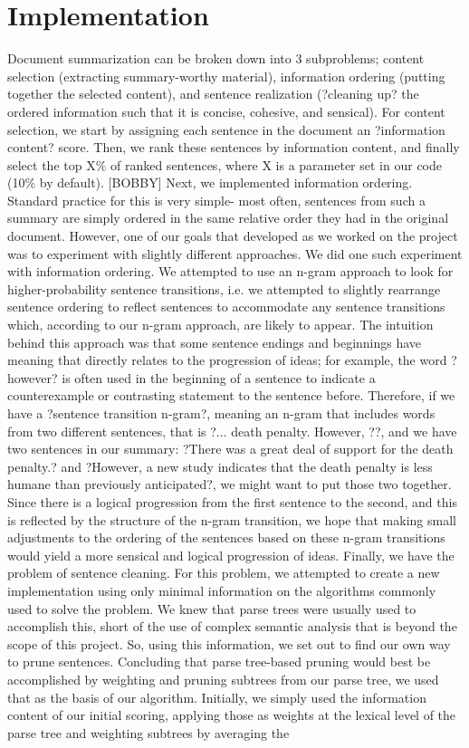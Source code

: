 \documentclass[12pt]{article}
\theoremstyle{plain}
\theoremstyle{definition}
\theoremstyle{remark}
\theoremstyle{plain}
\begin{document}
\section{Implementation}
Document summarization can be broken down into 3 subproblems; content selection (extracting summary-worthy material), information ordering (putting together the selected content), and sentence realization (?cleaning up? the ordered information such that it is concise, cohesive, and sensical). For content selection, we start by assigning each sentence in the document an ?information content? score. Then, we rank these sentences by information content, and finally select the top X\% of ranked sentences, where X is a parameter set in our code (10\% by default). [BOBBY]
	Next, we implemented information ordering. Standard practice for this is very simple- most often, sentences from such a summary are simply ordered in the same relative order they had in the original document. However, one of our goals that developed as we worked on the project was to experiment with slightly different approaches. We did one such experiment with information ordering. We attempted to use an n-gram approach to look for higher-probability sentence transitions, i.e. we attempted to slightly rearrange sentence ordering to reflect sentences to accommodate any sentence transitions which, according to our n-gram approach, are likely to appear. 
The intuition behind this approach was that some sentence endings and beginnings have meaning that directly relates to the progression of ideas; for example, the word ?however? is often used in the beginning of a sentence to indicate a counterexample or contrasting statement to the sentence before. Therefore, if we have a ?sentence transition n-gram?, meaning an n-gram that includes words from two different sentences, that is ?... death penalty. However, ??, and we have two sentences in our summary: ?There was a great deal of support for the death penalty.? and ?However, a new study indicates that the death penalty is less humane than previously anticipated?, we might want to put those two together. Since there is a logical progression from the first sentence to the second, and this is reflected by the structure of the n-gram transition, we hope that making small adjustments to the ordering of the sentences based on these n-gram transitions would yield a more sensical and logical progression of ideas. 
Finally, we have the problem of sentence cleaning. For this problem, we attempted to create a new implementation using only minimal information on the algorithms commonly used to solve the problem. We knew that parse trees were usually used to accomplish this, short of the use of complex semantic analysis that is beyond the scope of this project. So, using this information, we set out to find our own way to prune sentences. 
Concluding that parse tree-based pruning would best be accomplished by weighting and pruning subtrees from our parse tree, we used that as the basis of our algorithm. Initially, we simply used the information content of our initial scoring, applying those as weights at the lexical level of the parse tree and weighting subtrees by averaging the 
\end{document}
